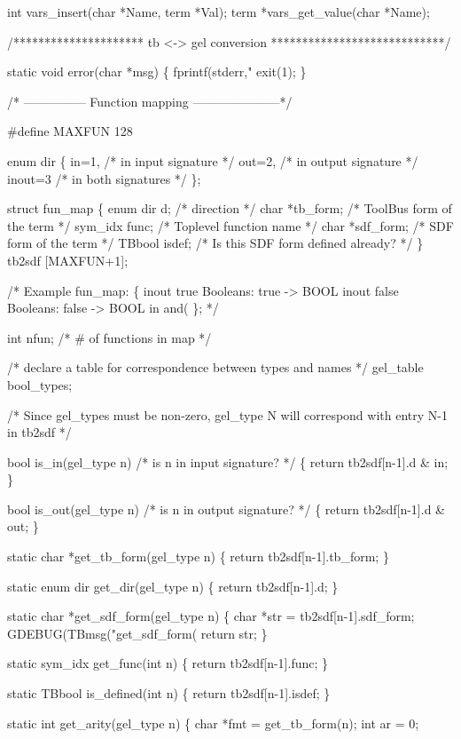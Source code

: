 int vars_insert(char *Name, term *Val);
term *vars_get_value(char *Name);

/********************* tb <-> gel conversion ****************************/

static void error(char *msg)
\{ fprintf(stderr,"%
  exit(1);
\}

/* ---------------  Function mapping ---------------------*/

#define MAXFUN 128

enum dir \{  in=1,    /* in input signature */
            out=2,   /* in output signature */
            inout=3  /* in both signatures */
          \};

struct fun_map \{
  enum dir  d;      /* direction */
  char *tb_form;    /* ToolBus form of the term */
  sym_idx func;     /* Toplevel function name */
  char *sdf_form;   /* SDF form of the term */
  TBbool isdef;     /* Is this SDF form defined already? */
\} tb2sdf [MAXFUN+1];

/* Example fun_map:
 \{
  inout  true         Booleans: true -> BOOL
  inout  false        Booleans: false -> BOOL
  in     and(%
 \};
*/

int nfun;          /* # of functions in map */

/* declare a table for correspondence between types and names */
gel_table bool_types;

/* Since gel_types must be non-zero, gel_type N will correspond with
   entry N-1 in tb2sdf */

bool is_in(gel_type n)    /* is n in input signature? */
\{
  return tb2sdf[n-1].d & in;
\}

bool is_out(gel_type n)   /* is n in output signature? */
\{
  return tb2sdf[n-1].d & out;
\}

static char *get_tb_form(gel_type n)
\{
  return tb2sdf[n-1].tb_form;
\}

static enum dir get_dir(gel_type n) \{ return tb2sdf[n-1].d; \}

static char *get_sdf_form(gel_type n)
\{
  char *str = tb2sdf[n-1].sdf_form;
  GDEBUG(TBmsg("get_sdf_form(%
  return str;
\}

static sym_idx get_func(int n)
\{
  return tb2sdf[n-1].func;
\}

static TBbool is_defined(int n)
\{
  return tb2sdf[n-1].isdef;
\}

static int get_arity(gel_type n)
\{
  char *fmt = get_tb_form(n);
  int ar = 0;

